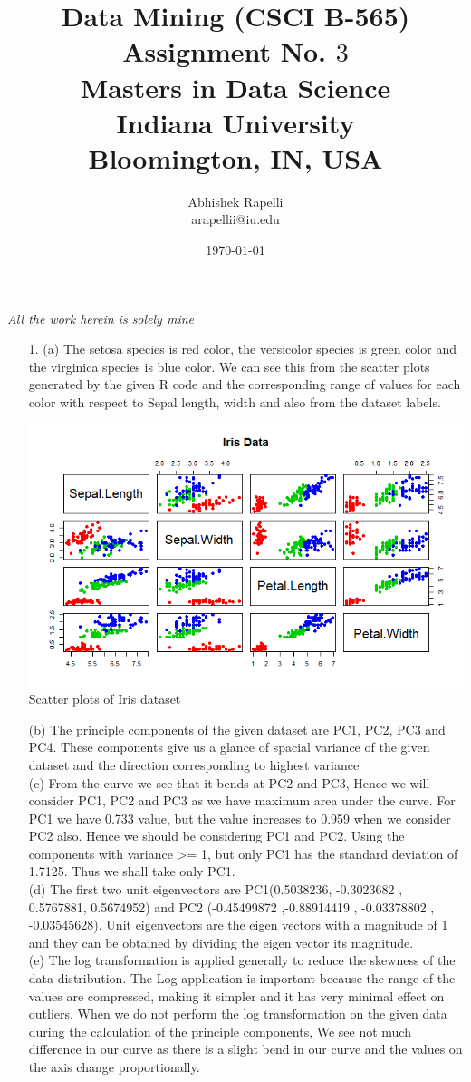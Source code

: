 \documentclass[12pt]{article}
\title{ Data Mining (CSCI B-565) \\
Assignment No. $3$ \\
Masters in Data Science \\Indiana University\\ Bloomington, IN, USA}
\author {Abhishek Rapelli \\ arapellii@iu.edu}
\date{\today}
\begin{document}
\maketitle
\begin{center}
\textit{All the work herein is solely mine}
\end{center}
\begin{enumerate}
	
\item[1.] (a) The setosa species is red color, the versicolor species is green color and the virginica species is blue color. We can see this from the scatter plots generated by the given R code and the corresponding range of values for each color with respect to Sepal length, width and also from the dataset labels.

\begin{center}
\includegraphics[width=0.5\columnwidth]{DM1} \\	Scatter plots of Iris dataset
\end{center}
(b) The principle components of the given dataset are PC1, PC2, PC3 and PC4. These components  give us a glance of spacial variance of the given dataset and the direction corresponding to highest variance \\
\newpage
(c) From the curve we see that it bends at PC2 and PC3, Hence we will consider PC1, PC2 and PC3 as we have maximum area under the curve. For PC1 we have 0.733 value, but the value increases to 0.959 when we consider PC2 also. Hence we should be considering PC1 and PC2. Using the components with variance >= 1, but only PC1 has the standard deviation of 1.7125. Thus we shall take only PC1. \\

(d) The first two unit eigenvectors are PC1(0.5038236, -0.3023682 , 0.5767881, 0.5674952) and PC2 (-0.45499872 ,-0.88914419 , -0.03378802 , -0.03545628). Unit eigenvectors are the eigen vectors with a magnitude of 1 and they can be obtained by dividing the eigen vector its magnitude. \\

(e) The log transformation is applied generally to reduce the skewness of the data distribution. The Log application is important because the range of the values are compressed, making it simpler and it has very minimal effect on outliers. When we do not perform the log transformation on the given data during the calculation of the principle components, We see not much difference in our curve as there is a slight bend in our curve and the values on the axis change proportionally. \\


\end{enumerate}
\end{document}
